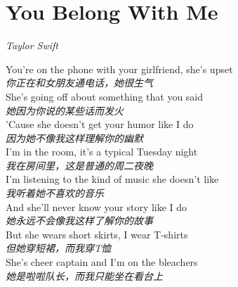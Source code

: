 \section{You Belong With Me}

\thispagestyle{empty}


\begin{center}
\textit{Taylor Swift}
\end{center}

\vspace{1em}

\begin{spacing}{1.5}
\begin{flushleft}
You're on the phone with your girlfriend, she's upset\\
{\textit{你正在和女朋友通电话，她很生气}}\\[0.5em]

She's going off about something that you said\\
{\textit{她因为你说的某些话而发火}}\\[0.5em]

'Cause she doesn't get your humor like I do\\
\textit{因为她不像我这样理解你的幽默}\\[0.5em]

I'm in the room, it's a typical Tuesday night\\
\textit{我在房间里，这是普通的周二夜晚}\\[0.5em]

I'm listening to the kind of music she doesn't like\\
\textit{我听着她不喜欢的音乐}\\[0.5em]

And she'll never know your story like I do\\
\textit{她永远不会像我这样了解你的故事}\\[0.5em]

But she wears short skirts, I wear T-shirts\\
\textit{但她穿短裙，而我穿T恤}\\[0.5em]

She's cheer captain and I'm on the bleachers\\
\textit{她是啦啦队长，而我只能坐在看台上}\\[0.5em]


\end{flushleft}
\end{spacing}

